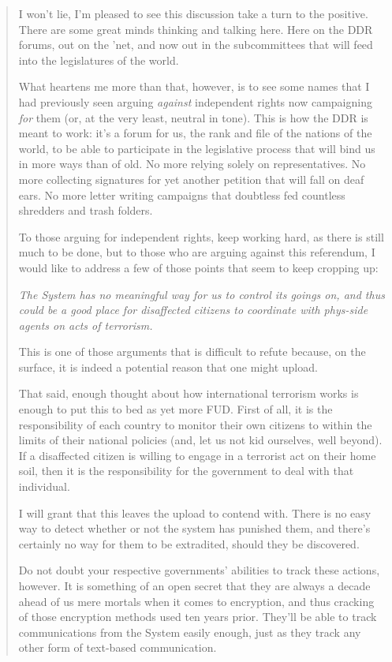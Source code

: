 \begin{quote}
I won't lie, I'm pleased to see this discussion take a turn to the positive. There are some great minds thinking and talking here. Here on the DDR forums, out on the 'net, and now out in the subcommittees that will feed into the legislatures of the world.

What heartens me more than that, however, is to see some names that I had previously seen arguing \emph{against} independent rights now campaigning \emph{for} them (or, at the very least, neutral in tone). This is how the DDR is meant to work: it's a forum for us, the rank and file of the nations of the world, to be able to participate in the legislative process that will bind us in more ways than of old. No more relying solely on representatives. No more collecting signatures for yet another petition that will fall on deaf ears. No more letter writing campaigns that doubtless fed countless shredders and trash folders.

To those arguing for independent rights, keep working hard, as there is still much to be done, but to those who are arguing against this referendum, I would like to address a few of those points that seem to keep cropping up:

\emph{The System has no meaningful way for us to control its goings on, and thus could be a good place for disaffected citizens to coordinate with phys-side agents on acts of terrorism.}

This is one of those arguments that is difficult to refute because, on the surface, it is indeed a potential reason that one might upload.

That said, enough thought about how international terrorism works is enough to put this to bed as yet more FUD. First of all, it is the responsibility of each country to monitor their own citizens to within the limits of their national policies (and, let us not kid ourselves, well beyond). If a disaffected citizen is willing to engage in a terrorist act on their home soil, then it is the responsibility for the government to deal with that individual.

I will grant that this leaves the upload to contend with. There is no easy way to detect whether or not the system has punished them, and there's certainly no way for them to be extradited, should they be discovered.

Do not doubt your respective governments' abilities to track these actions, however. It is something of an open secret that they are always a decade ahead of us mere mortals when it comes to encryption, and thus cracking of those encryption methods used ten years prior. They'll be able to track communications from the System easily enough, just as they track any other form of text-based communication.


\end{quote}
